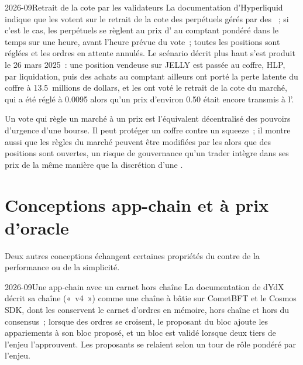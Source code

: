 \begin{dated}{2026-09}{Retrait de la cote par les validateurs}\label{dat:m3:on-chain-order-books-and-perpetual-dexs:delist}
La documentation d'Hyperliquid indique que les  votent sur le retrait de la cote des perpétuels gérés par des ~; si c'est le cas, les perpétuels se règlent au
prix d' au comptant pondéré dans le temps sur une heure, avant l'heure prévue du vote~; toutes les positions sont réglées et les ordres en attente annulés.
Le scénario décrit plus haut s'est produit le 26 mars 2025~: une position vendeuse sur JELLY est passée au coffre, HLP, par liquidation, puis des achats au comptant ailleurs ont porté la perte latente du coffre
à 13.5~millions de dollars, et les  ont voté le retrait de la cote du marché, qui a été réglé à 0.0095 alors qu'un prix d'environ 0.50 était encore transmis à
l'.
\end{dated}

Un vote qui règle un marché à un prix est l'équivalent décentralisé des pouvoirs d'urgence d'une bourse. Il peut protéger un coffre contre un squeeze~; il
montre aussi que les règles du marché peuvent être modifiées par les  alors que des positions sont ouvertes, un risque de gouvernance qu'un trader intègre dans ses prix de la même manière
que la discrétion d'une .

\section{Conceptions app-chain et à prix d'oracle}

Deux autres conceptions échangent certaines propriétés du  contre de la performance ou de la simplicité.

\begin{dated}{2026-09}{Une app-chain avec un carnet hors chaîne}\label{dat:m3:on-chain-order-books-and-perpetual-dexs:dydx}
La documentation de dYdX décrit sa chaîne («~v4~») comme une chaîne à  bâtie sur CometBFT et le Cosmos SDK, dont les  conservent le carnet d'ordres
en mémoire, hors chaîne et hors du consensus~; lorsque des ordres se croisent, le proposant du bloc ajoute les appariements à son bloc proposé, et un bloc est validé lorsque
deux tiers de l'enjeu l'approuvent. Les proposants se relaient selon un tour de rôle pondéré par l'enjeu.
\end{dated}


